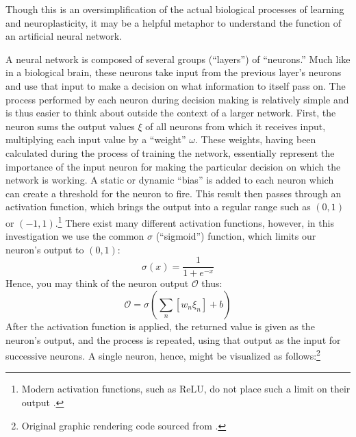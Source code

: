 \documentclass{article}
\begin{document}
Though this is an oversimplification of the actual biological processes of learning and neuroplasticity, it may be a helpful metaphor to understand the function of an artificial neural network.

A neural network is composed of several groups (``layers'') of ``neurons.'' Much like in a biological brain, these neurons take input from the previous layer's neurons and use that input to make a decision on what information to itself pass on. The process performed by each neuron during decision making is relatively simple and is thus easier to think about outside the context of a larger network. First, the neuron sums the output values $\xi$ of all neurons from which it receives input, multiplying each input value by a ``weight'' $\omega$. These weights, having been calculated during the process of training the network, essentially represent the importance of the input neuron for making the particular decision on which the network is working. A static or dynamic ``bias'' is added to each neuron which can create a threshold for the neuron to fire. This result then passes through an activation function, which brings the output into a regular range such as $(0, 1)$ or $(-1, 1)$.\footnote{Modern activation functions, such as ReLU, do not place such a limit on their output \cite{activationfunctions}.} There exist many different activation functions, however, in this investigation we use the common $\sigma$ (``sigmoid'') function, which limits our neuron's output to $(0, 1)$:
$$\sigma(x)=\frac{1}{1+e^{-x}}$$
Hence, you may think of the neuron output $\mathcal{O}$ thus:
$$\mathcal{O}=\sigma(\sum_n[w_{n}\xi_{n}]+b)$$
After the activation function is applied, the returned value is given as the neuron's output, and the process is repeated, using that output as the input for successive neurons. A single neuron, hence, might be visualized as follows:\footnote{Original graphic rendering code sourced from \cite{neurondiagrams}.}
\end{document}

